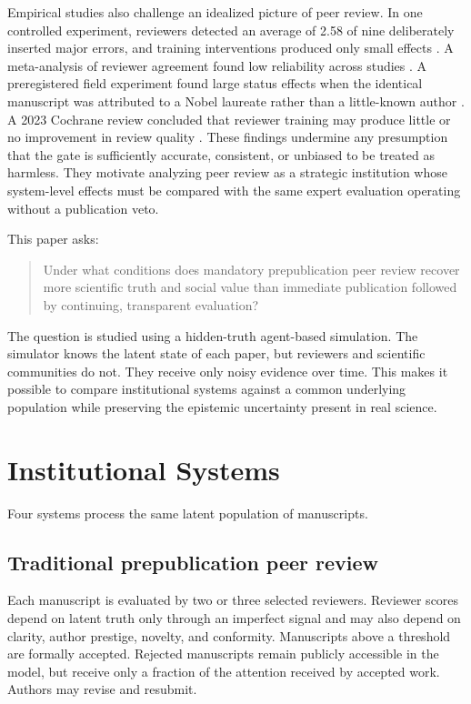 Empirical studies also challenge an idealized picture of peer review. In one controlled experiment, reviewers detected an average of 2.58 of nine deliberately inserted major errors, and training interventions produced only small effects \citep{schroter2008}. A meta-analysis of reviewer agreement found low reliability across studies \citep{bornmann2010}. A preregistered field experiment found large status effects when the identical manuscript was attributed to a Nobel laureate rather than a little-known author \citep{huber2022}. A 2023 Cochrane review concluded that reviewer training may produce little or no improvement in review quality \citep{hesselberg2023}. These findings undermine any presumption that the gate is sufficiently accurate, consistent, or unbiased to be treated as harmless. They motivate analyzing peer review as a strategic institution whose system-level effects must be compared with the same expert evaluation operating without a publication veto.

This paper asks:

\begin{quote}
Under what conditions does mandatory prepublication peer review recover more scientific truth and social value than immediate publication followed by continuing, transparent evaluation?
\end{quote}

The question is studied using a hidden-truth agent-based simulation. The simulator knows the latent state of each paper, but reviewers and scientific communities do not. They receive only noisy evidence over time. This makes it possible to compare institutional systems against a common underlying population while preserving the epistemic uncertainty present in real science.

\section{Institutional Systems}

Four systems process the same latent population of manuscripts.

\subsection{Traditional prepublication peer review}

Each manuscript is evaluated by two or three selected reviewers. Reviewer scores depend on latent truth only through an imperfect signal and may also depend on clarity, author prestige, novelty, and conformity. Manuscripts above a threshold are formally accepted. Rejected manuscripts remain publicly accessible in the model, but receive only a fraction of the attention received by accepted work. Authors may revise and resubmit.

